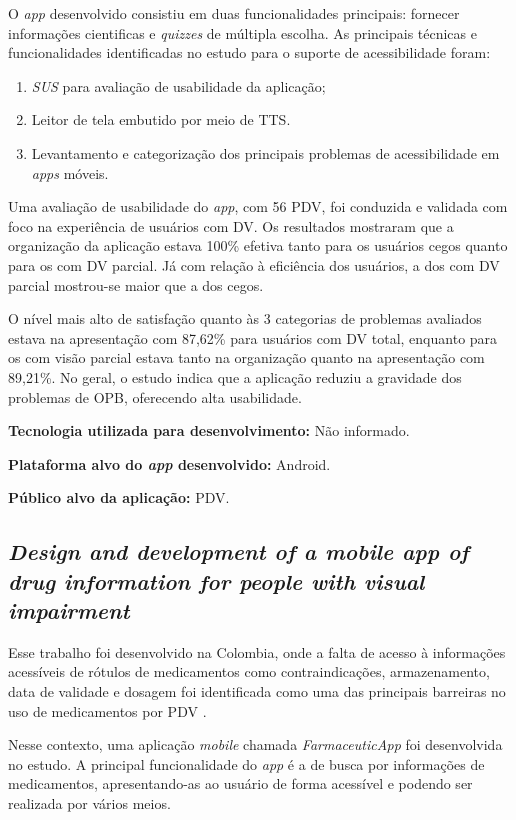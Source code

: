 O \emph{app} desenvolvido consistiu em duas funcionalidades principais: fornecer informações cientificas e \emph{quizzes} de múltipla escolha.
As principais técnicas e funcionalidades identificadas no estudo para o suporte de acessibilidade foram:

\begin{enumerate}
    \item \emph{SUS} para avaliação de usabilidade da aplicação;
    \item Leitor de tela embutido por meio de TTS\@.
    \item Levantamento e categorização dos principais problemas de acessibilidade em \emph{apps} móveis.
\end{enumerate}

Uma avaliação de usabilidade do \emph{app}, com 56 PDV, foi conduzida e validada com foco na experiência de usuários com DV\@.
Os resultados mostraram que a organização da aplicação estava 100\% efetiva tanto para os usuários cegos quanto para os com DV parcial.
Já com relação à eficiência dos usuários, a dos com DV parcial mostrou-se maior que a dos cegos.

O nível mais alto de satisfação quanto às 3 categorias de problemas avaliados estava na apresentação com
87,62\% para usuários com DV total, enquanto para os com visão parcial estava tanto na organização quanto
na apresentação com 89,21\%.
No geral, o estudo indica que a aplicação reduziu a gravidade dos problemas de OPB, oferecendo alta usabilidade.

\textbf{Tecnologia utilizada para desenvolvimento:} Não informado.

\textbf{Plataforma alvo do \emph{app} desenvolvido:} Android.

\textbf{Público alvo da aplicação:} PDV\@.

\subsection{\emph{Design and development of a mobile app of drug information for people with visual impairment}}

Esse trabalho foi desenvolvido na Colombia, onde a falta de acesso à informações acessíveis
de rótulos de medicamentos como contraindicações, armazenamento, data de validade e dosagem foi identificada como uma
das principais barreiras no uso de medicamentos por PDV \cite{Amariles2020}.

Nesse contexto, uma aplicação \emph{mobile} chamada \emph{FarmaceuticApp} foi desenvolvida no estudo.
A principal funcionalidade do \emph{app} é a de busca por informações de medicamentos, apresentando-as
ao usuário de forma acessível e podendo ser realizada por vários meios.

